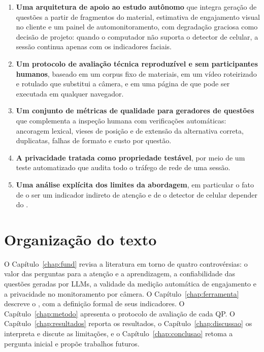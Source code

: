 \begin{enumerate}
  \item \textbf{Uma arquitetura de apoio ao estudo autônomo} que integra geração de questões a partir de fragmentos do material, estimativa de engajamento visual no cliente e um painel de automonitoramento, com degradação graciosa como decisão de projeto: quando o computador não suporta o detector de celular, a sessão continua apenas com os indicadores faciais.
  \item \textbf{Um protocolo de avaliação técnica reproduzível e sem participantes humanos}, baseado em um corpus fixo de materiais, em um vídeo roteirizado e rotulado que substitui a câmera, e em uma página de  que pode ser executada em qualquer navegador.
  \item \textbf{Um conjunto de métricas de qualidade para geradores de questões} que complementa a inspeção humana com verificações automáticas: ancoragem lexical, vieses de posição e de extensão da alternativa correta, duplicatas, falhas de formato e custo por questão.
  \item \textbf{A privacidade tratada como propriedade testável}, por meio de um teste automatizado que audita todo o tráfego de rede de uma sessão.
  \item \textbf{Uma análise explícita dos limites da abordagem}, em particular o fato de o \fs ser um indicador indireto de atenção e de o detector de celular depender do .
\end{enumerate}

\section{Organização do texto}

O Capítulo~\ref{chap:fund} revisa a literatura em torno de quatro controvérsias: o valor das perguntas para a atenção e a aprendizagem, a confiabilidade das questões geradas por LLMs, a validade da medição automática de engajamento e a privacidade no monitoramento por câmera. O Capítulo~\ref{chap:ferramenta} descreve o \ferramenta, com a definição formal de seus indicadores. O Capítulo~\ref{chap:metodo} apresenta o protocolo de avaliação de cada QP. O Capítulo~\ref{chap:resultados} reporta os resultados, o Capítulo~\ref{chap:discussao} os interpreta e discute as limitações, e o Capítulo~\ref{chap:conclusao} retoma a pergunta inicial e propõe trabalhos futuros.
